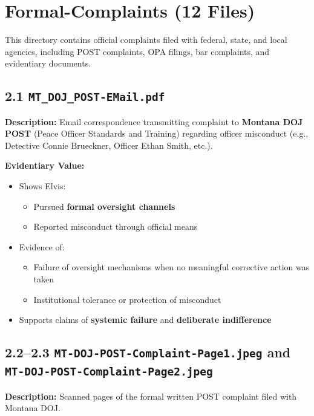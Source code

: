 \documentclass[11pt, letterpaper]{article}
\begin{document}
\newpage

\section{Formal-Complaints (12 Files)}

This directory contains official complaints filed with federal, state, and local agencies, including POST complaints, OPA filings, bar complaints, and evidentiary documents.

\subsection{2.1 \texttt{MT\_DOJ\_POST-EMail.pdf}}

\textbf{Description:} Email correspondence transmitting complaint to \textbf{Montana DOJ POST} (Peace Officer Standards and Training) regarding officer misconduct (e.g., Detective Connie Brueckner, Officer Ethan Smith, etc.).

\textbf{Evidentiary Value:}

\begin{itemize}[leftmargin=*]
  \item Shows Elvis:
    \begin{itemize}
      \item Pursued \textbf{formal oversight channels}
      \item Reported misconduct through official means
    \end{itemize}
  \item Evidence of:
    \begin{itemize}
      \item Failure of oversight mechanisms when no meaningful corrective action was taken
      \item Institutional tolerance or protection of misconduct
    \end{itemize}
  \item Supports claims of \textbf{systemic failure} and \textbf{deliberate indifference}
\end{itemize}

\subsection{2.2--2.3 \texttt{MT-DOJ-POST-Complaint-Page1.jpeg} and \texttt{MT-DOJ-POST-Complaint-Page2.jpeg}}

\textbf{Description:} Scanned pages of the formal written POST complaint filed with Montana DOJ.
\end{document}
